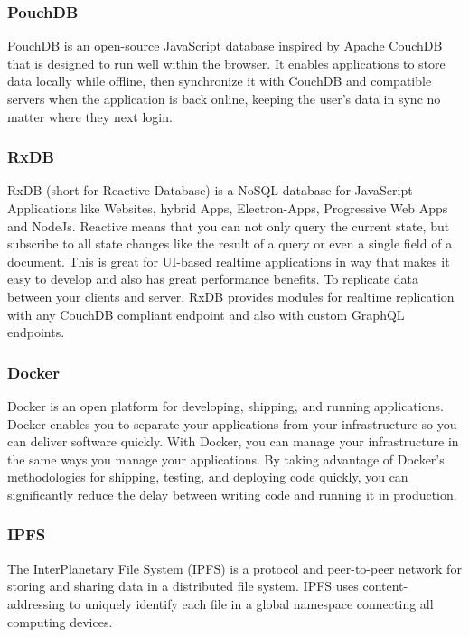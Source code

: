     \subsubsection{PouchDB}
    PouchDB is an open-source JavaScript database inspired by Apache CouchDB 
    that is designed to run well within the browser.
    It enables applications to store data locally while offline, 
    then synchronize it with CouchDB and compatible servers when the application is back online, keeping the user's data in sync 
    no matter where they next login.

    \subsubsection{RxDB}
    RxDB (short for Reactive Database) is a NoSQL-database for JavaScript Applications like Websites, 
    hybrid Apps, Electron-Apps, Progressive Web Apps and NodeJs. Reactive means that you can not only 
    query the current state, but subscribe to all state changes like the result of a query or even a 
    single field of a document. This is great for UI-based realtime applications in way that makes it 
    easy to develop and also has great performance benefits. To replicate data between your clients and server,
    RxDB provides modules for realtime replication with any CouchDB compliant endpoint and also with custom GraphQL endpoints. 

    \subsubsection{Docker}
    Docker is an open platform for developing, shipping, and running applications. 
    Docker enables you to separate your applications from your infrastructure so you can deliver software quickly. 
    With Docker, you can manage your infrastructure in the same ways you manage your applications. 
    By taking advantage of Docker’s methodologies for shipping, testing, and deploying code quickly, 
    you can significantly reduce the delay between writing code and running it in production.

    \subsubsection{IPFS}
    The InterPlanetary File System (IPFS) is a protocol and peer-to-peer network for storing and sharing data in a distributed file system. 
    IPFS uses content-addressing to uniquely identify each file in a global namespace connecting all computing devices.

